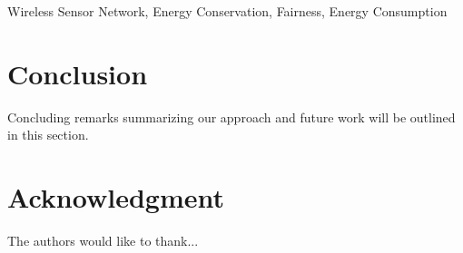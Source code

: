 \documentclass[11pt,conference]{IEEEtran}
\begin{document}
\begin{keywords}
Wireless Sensor Network, Energy Conservation, Fairness, Energy Consumption
\end{keywords}

\IEEEpeerreviewmaketitle








\section{Conclusion}\label{conclusion}
Concluding remarks summarizing our approach and future work will be outlined in this section.

\section*{Acknowledgment}

The authors would like to thank...






\end{document}
